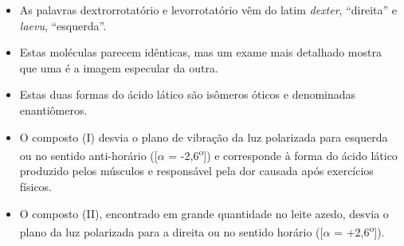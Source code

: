 \documentclass[presentation,professionalfonts,aspectratio=169]{beamer}
\begin{document}
\begin{frame}[label={sec:org090d741}]{}
\begin{itemize}
\item As palavras dextrorrotatório e levorrotatório vêm do latim \emph{dexter}, \alert{“direita”} e \emph{laevu}, \alert{“esquerda”}.
\end{itemize}
\begin{center}
\end{center}

\begin{itemize}
\item Estas moléculas parecem idênticas, mas um exame mais detalhado mostra que uma é a imagem especular da outra.
\item Estas duas formas do ácido lático são isômeros óticos e denominadas \alert{enantiômeros}.
\end{itemize}
\end{frame}


\begin{frame}[label={sec:org81c4855}]{}
\begin{center}
\end{center}

\begin{itemize}
\item O composto (I) desvia o plano de vibração da luz polarizada para esquerda ou no sentido anti-horário ([\(\alpha\) = -2,6\textsuperscript{o}]) e corresponde à forma do ácido lático produzido pelos músculos e responsável pela dor causada após exercícios físicos.
\item O composto (II), encontrado em grande quantidade no leite azedo, desvia o plano da luz polarizada para a direita ou no sentido horário ([\(\alpha\) = +2,6\textsuperscript{o}]).
\end{itemize}
\end{frame}
\end{document}
